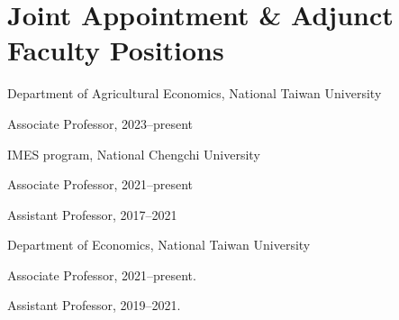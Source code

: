 \documentclass[10pt,letterpaper]{article}
\renewenvironment{itemize}{
  \begin{list}{}{
      \setlength{\leftmargin}{1.5em}
      \setlength{\itemsep}{0.25em}
      \setlength{\parskip}{0pt}
      \setlength{\parsep}{0.25em}
    }
}{
  \end{list}
}
\begin{document}
\section*{\textbf{Joint Appointment \& Adjunct Faculty Positions}}
\begin{itemize}
\item Department of Agricultural Economics, National Taiwan University
\begin{itemize}
	\item Associate Professor, 2023--present
\end{itemize}		
		
\item IMES program, National Chengchi University
\begin{itemize}
	\item Associate Professor, 2021--present
	\item Assistant Professor, 2017--2021
\end{itemize}	
	
\item Department of Economics, National Taiwan University
\begin{itemize}
	\item Associate Professor, 2021--present.
	\item Assistant Professor, 2019--2021.
\end{itemize}


\end{itemize}

%
\end{document}
